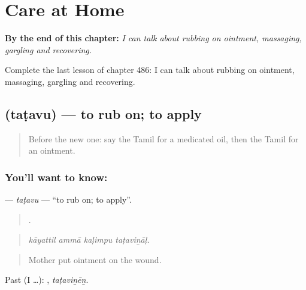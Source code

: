
\chapter{Care at Home}
\label{ch:ta-care-at-home}

\begin{chapteropening}
\textbf{By the end of this chapter:} \emph{I can talk about rubbing on ointment, massaging, gargling and recovering.}

Complete the last lesson of chapter 486: I can talk about rubbing on ointment, massaging, gargling and recovering.
\end{chapteropening}

\section[\texorpdfstring{\ta{தடவு} (taṭavu)}{தடவு (taṭavu)}]{ (taṭavu) — to rub on; to apply}

\label{lesson:TA-C486-tatavu}



\begin{quote}
Before the new one: say the Tamil for a medicated oil, then the Tamil for an ointment.
\end{quote}

\subsection*{You'll want to know: }
\textbf{} — \emph{taṭavu} — \textquotedblleft{}to rub on; to apply\textquotedblright{}.

\begin{quote}
   .
\end{quote}

\begin{quote}
\emph{kāyattil ammā kaḷimpu taṭaviṉāḷ.}
\end{quote}

\begin{quote}
Mother put ointment on the wound.
\end{quote}

Past (I …): , \emph{taṭaviṉēṉ}.

